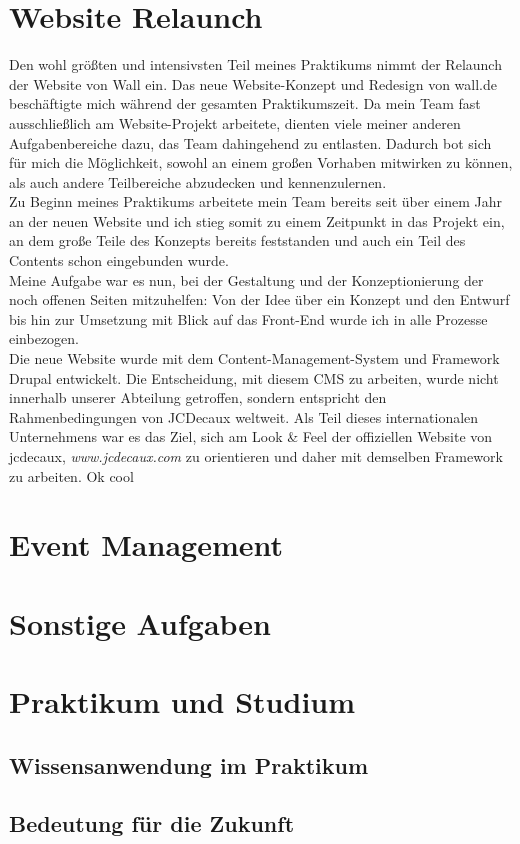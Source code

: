 \section{Website Relaunch}\label{sec:webrelaunch}

Den wohl größten und intensivsten Teil meines Praktikums nimmt der Relaunch der Website von Wall ein. Das neue Website-Konzept und Redesign von wall.de beschäftigte mich während der gesamten Praktikumszeit. Da mein Team fast ausschließlich am Website-Projekt arbeitete, dienten viele meiner anderen Aufgabenbereiche dazu, das Team dahingehend zu entlasten. Dadurch bot sich für mich die Möglichkeit, sowohl an einem großen Vorhaben mitwirken zu können, als auch andere Teilbereiche abzudecken und kennenzulernen. \\ Zu Beginn meines Praktikums arbeitete mein Team bereits seit über einem Jahr an der neuen Website und ich stieg somit zu einem Zeitpunkt in das Projekt ein, an dem große Teile des Konzepts bereits feststanden und auch ein Teil des Contents schon eingebunden wurde. \\ Meine Aufgabe war es nun, bei der Gestaltung und der Konzeptionierung der noch offenen Seiten mitzuhelfen: Von der Idee über ein Konzept und den Entwurf bis hin zur Umsetzung mit Blick auf das Front-End wurde ich in alle Prozesse einbezogen. \\ Die neue Website wurde mit dem Content-Management-System und Framework Drupal entwickelt. Die Entscheidung, mit diesem CMS zu arbeiten, wurde nicht innerhalb unserer Abteilung getroffen, sondern entspricht den Rahmenbedingungen von JCDecaux weltweit. Als Teil dieses internationalen Unternehmens war es das Ziel, sich am Look \& Feel der offiziellen Website von jcdecaux, \textit{www.jcdecaux.com} zu orientieren und daher mit demselben Framework zu arbeiten. Ok cool


\section{Event Management}\label{sec:eventmanagement}
\section{Sonstige Aufgaben}\label{sec:sonstiges}
\section{Praktikum und Studium}\label{sec:praktikumstudium}
\subsection{Wissensanwendung im Praktikum}\label{sec:wissensanwendung}
\subsection{Bedeutung für die Zukunft}\label{sec:zukunft}

\newpage